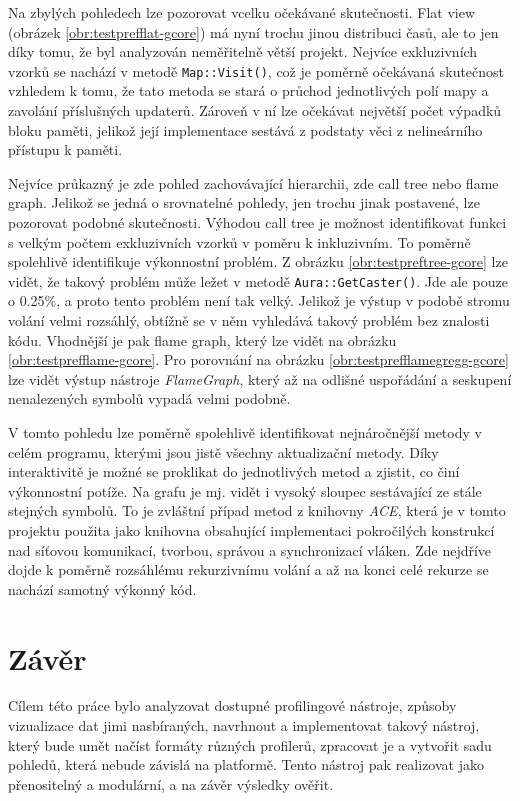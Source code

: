 \documentclass[czech,BP]{thesiskiv}
\begin{document}
Na zbylých pohledech lze pozorovat vcelku očekávané skutečnosti. Flat view (obrázek \ref{obr:testprefflat-gcore}) má nyní trochu jinou distribuci časů, ale to jen díky tomu, že byl analyzován neměřitelně větší projekt. Nejvíce exkluzivních vzorků se nachází v metodě \texttt{Map::Visit()}, což je poměrně očekávaná skutečnost vzhledem k tomu, že tato metoda se stará o průchod jednotlivých polí mapy a zavolání příslušných updaterů. Zároveň v ní lze očekávat největší počet výpadků bloku paměti, jelikož její implementace sestává z podstaty věci z nelineárního přístupu k paměti.

Nejvíce průkazný je zde pohled zachovávající hierarchii, zde call tree nebo flame graph. Jelikož se jedná o srovnatelné pohledy, jen trochu jinak postavené, lze pozorovat podobné skutečnosti. Výhodou call tree je možnost identifikovat funkci s velkým počtem exkluzivních vzorků v poměru k inkluzivním. To poměrně spolehlivě identifikuje výkonnostní problém. Z obrázku \ref{obr:testpreftree-gcore} lze vidět, že takový problém může ležet v metodě \texttt{Aura::GetCaster()}. Jde ale pouze o 0.25\%, a proto tento problém není tak velký. Jelikož je výstup v podobě stromu volání velmi rozsáhlý, obtížně se v něm vyhledává takový problém bez znalosti kódu. Vhodnější je pak flame graph, který lze vidět na obrázku \ref{obr:testprefflame-gcore}. Pro porovnání na obrázku \ref{obr:testprefflamegregg-gcore} lze vidět výstup nástroje \emph{FlameGraph}, který až na odlišné uspořádání a seskupení nenalezených symbolů vypadá velmi podobně.

V tomto pohledu lze poměrně spolehlivě identifikovat nejnáročnější metody v celém programu, kterými jsou jistě všechny aktualizační metody. Díky interaktivitě je možné se proklikat do jednotlivých metod a zjistit, co činí výkonnostní potíže. Na grafu je mj. vidět i vysoký sloupec sestávající ze stále stejných symbolů. To je zvláštní případ metod z knihovny \emph{ACE}, která je v tomto projektu použita jako knihovna obsahující implementaci pokročilých konstrukcí nad síťovou komunikací, tvorbou, správou a synchronizací vláken. Zde nejdříve dojde k poměrně rozsáhlému rekurzivnímu volání a až na konci celé rekurze se nachází samotný výkonný kód.




\newpage

\chapter{Závěr}

Cílem této práce bylo analyzovat dostupné profilingové nástroje, způsoby vizualizace dat jimi nasbíraných, navrhnout a implementovat takový nástroj, který bude umět načíst formáty různých profilerů, zpracovat je a vytvořit sadu pohledů, která nebude závislá na platformě. Tento nástroj pak realizovat jako přenositelný a modulární, a na závěr výsledky ověřit.
\end{document}
